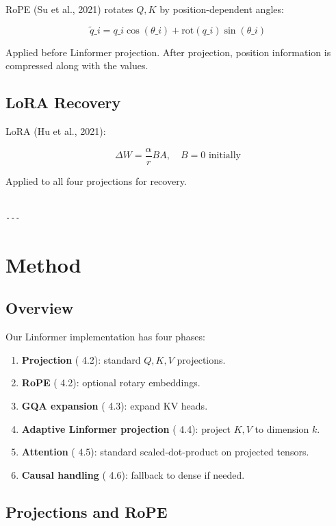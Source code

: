 RoPE (Su et al., 2021) rotates $Q, K$ by position-dependent angles:

\[
\tilde{q}\_i = q\_i \cos(\theta\_i) + \text{rot}(q\_i) \sin(\theta\_i)
\tag{3.9}
\]

Applied before Linformer projection. After projection, position information 
is compressed along with the values.

\subsection{LoRA Recovery}

LoRA (Hu et al., 2021):

\[
\Delta W = \frac{\alpha}{r} B A, \quad B = 0 \text{ initially}
\tag{3.10}
\]

Applied to all four projections for recovery.
\begin{lstlisting}

---
\end{lstlisting}

\section{Method}

\subsection{Overview}

Our Linformer implementation has four phases:

\begin{enumerate}
\item \textbf{Projection} ( 4.2): standard $Q, K, V$ projections.
\item \textbf{RoPE} ( 4.2): optional rotary embeddings.
\item \textbf{GQA expansion} ( 4.3): expand KV heads.
\item \textbf{Adaptive Linformer projection} ( 4.4): project $K, V$ to dimension $k$.
\item \textbf{Attention} ( 4.5): standard scaled-dot-product on projected tensors.
\item \textbf{Causal handling} ( 4.6): fallback to dense if needed.

\end{enumerate}
\subsection{Projections and RoPE}

